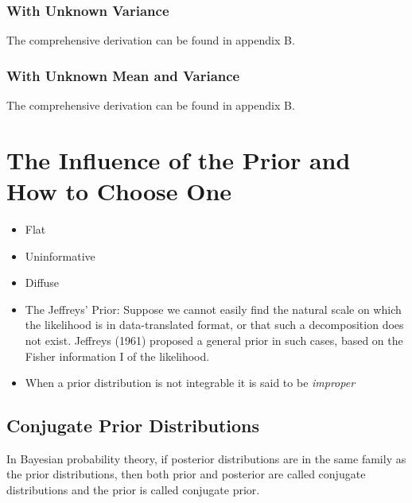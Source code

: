 \subsubsection{With Unknown Variance}

The comprehensive derivation can be found in appendix B. 

\subsubsection{With Unknown Mean and Variance}

The comprehensive derivation can be found in appendix B. 




\section{The Influence of the Prior and How to Choose One}\label{sec:prior}

\begin{itemize}
    \item Flat
    \item Uninformative
    \item Diffuse
    \item The Jeffreys’ Prior: Suppose we cannot easily find the natural scale on which the likelihood is in data-translated format, or that such a decomposition does not exist. Jeffreys (1961) proposed a general prior in such cases, based on the Fisher information I of the likelihood. 
    \item When a prior distribution is not integrable it is said to be \textit{improper}
\end{itemize}


\subsection{Conjugate Prior Distributions}

In Bayesian probability theory, if posterior
distributions are in the same family as the prior
distributions, then both prior and posterior are called
conjugate distributions and the prior is called
conjugate prior.

